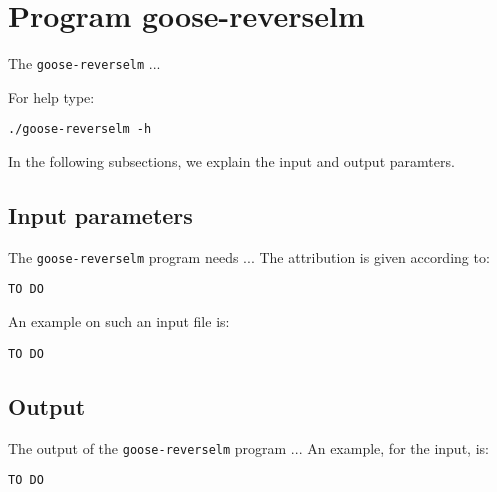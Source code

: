 \section{Program goose-reverselm}
The \texttt{goose-reverselm} ...

For help type:
\begin{lstlisting}
./goose-reverselm -h
\end{lstlisting}
In the following subsections, we explain the input and output paramters.

\subsection*{Input parameters}

The \texttt{goose-reverselm} program needs ...
The attribution is given according to:
\begin{lstlisting}
TO DO
\end{lstlisting}

An example on such an input file is:
\begin{lstlisting}
TO DO
\end{lstlisting}

\subsection*{Output}
The output of the \texttt{goose-reverselm} program ...
An example, for the input, is:
\begin{lstlisting}
TO DO
\end{lstlisting}
